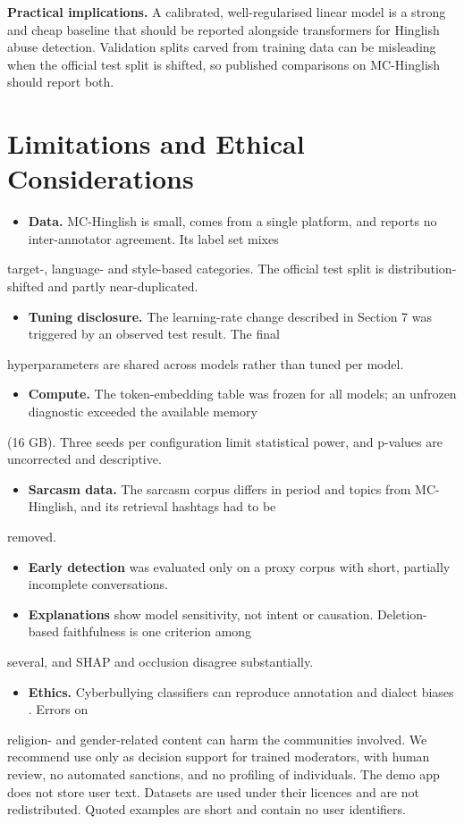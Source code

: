 \documentclass[10pt,twocolumn]{article}
\begin{document}
\textbf{Practical implications.} A calibrated, well-regularised linear model is a strong and cheap baseline that should be
reported alongside transformers for Hinglish abuse detection. Validation splits carved from training data can be misleading
when the official test split is shifted, so published comparisons on MC-Hinglish should report both.

\section{Limitations and Ethical Considerations}

\begin{itemize}
\item \textbf{Data.} MC-Hinglish is small, comes from a single platform, and reports no inter-annotator agreement. Its label set mixes
\end{itemize}
  target-, language- and style-based categories. The official test split is distribution-shifted and partly near-duplicated.
\begin{itemize}
\item \textbf{Tuning disclosure.} The learning-rate change described in Section 7 was triggered by an observed test result. The final
\end{itemize}
  hyperparameters are shared across models rather than tuned per model.
\begin{itemize}
\item \textbf{Compute.} The token-embedding table was frozen for all models; an unfrozen diagnostic exceeded the available memory
\end{itemize}
  (16 GB). Three seeds per configuration limit statistical power, and p-values are uncorrected and descriptive.
\begin{itemize}
\item \textbf{Sarcasm data.} The sarcasm corpus differs in period and topics from MC-Hinglish, and its retrieval hashtags had to be
\end{itemize}
  removed.
\begin{itemize}
\item \textbf{Early detection} was evaluated only on a proxy corpus with short, partially incomplete conversations.
\item \textbf{Explanations} show model sensitivity, not intent or causation. Deletion-based faithfulness is one criterion among
\end{itemize}
  several, and SHAP and occlusion disagree substantially.
\begin{itemize}
\item \textbf{Ethics.} Cyberbullying classifiers can reproduce annotation and dialect biases \cite{sap2019racial}. Errors on
\end{itemize}
  religion- and gender-related content can harm the communities involved. We recommend use only as decision support for
  trained moderators, with human review, no automated sanctions, and no profiling of individuals. The demo app does not
  store user text. Datasets are used under their licences and are not redistributed. Quoted examples are short and contain
  no user identifiers.
\end{document}
